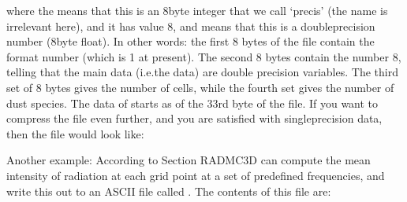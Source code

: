 \documentclass[letterpaper,10pt,english]{sphinxmanual}
\begin{document}
where the  means that this is an 8\sphinxhyphen{}byte integer that we call
‘precis’ (the name is irrelevant here), and it has value 8, and
 means that this is a double\sphinxhyphen{}precision number
(8\sphinxhyphen{}byte float). In other words: the first 8 bytes of the file contain the format
number (which is 1 at present). The second 8 bytes contain the number 8, telling
that the main data (i.e.the  data) are double precision
variables. The third set of 8 bytes gives the number of cells, while the fourth
set gives the number of dust species. The data of  starts as of the
33rd byte of the file. If you want to compress the file even further, and you
are satisfied with single\sphinxhyphen{}precision data, then the file would look like:

\begin{sphinxVerbatim}[commandchars=\\\{\}]
\PYG{p}{[}\PYG{p}{]}
\PYG{p}{[}\PYG{p}{]}
\PYG{p}{[}\PYG{p}{]}
\PYG{p}{[}\PYG{p}{]}
\end{sphinxVerbatim}

Another example: According to Section {\hyperref[\detokenize{dustradtrans:sec-dust-monochromatic-monte-carlo}]{}}
RADMC\sphinxhyphen{}3D can compute the mean intensity of radiation at each grid point at a set
of pre\sphinxhyphen{}defined frequencies, and write this out to an ASCII file called
. The contents of this file are:
\end{document}
